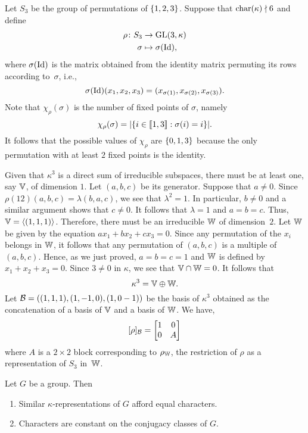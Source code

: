 \begin{xmpl}\label{xmpl:S_3-character}
    Let $S_3$ be the group of permutations of $\{1,2,3\}$. Suppose that $\operatorname{char}(\kappa)\nmid6$ and define
    \begin{align*}
        \rho\colon S_3&\to\operatorname{GL}(3,\kappa)\\
        \sigma&\mapsto\sigma(\operatorname{Id}),
    \end{align*}
    where $\sigma(\operatorname{Id})$ is the matrix obtained from the identity matrix permuting its rows according to~$\sigma$, i.e.,
    $$
        \sigma(\operatorname{Id})(x_1,x_2,x_3)
            =
            (x_{\sigma(1)},x_{\sigma(2)},x_{\sigma(3)}).
    $$
    Note that $\chi_\rho(\sigma)$ is the number of fixed points of $\sigma$, namely
    $$
        \chi_\rho(\sigma) = |\{i\in\llbracket1,3\rrbracket:\sigma(i)=i\}|.
    $$
    It follows that the possible values of $\chi_\rho$ are $\{0,1,3\}$ because the only permutation with at least $2$ fixed points is the identity.

    Given that $\kappa^3$ is a direct sum of irreducible subspaces, there must be at least one, say $\mathbb V$, of dimension $1$. Let $(a,b,c)$ be its generator. Suppose that $a\ne0$. Since $\rho(12)(a,b,c)=\lambda(b,a,c)$, we see that $\lambda^2=1$. In particular, $b\ne0$ and a similar argument shows that $c\ne0$. It follows that $\lambda=1$ and $a=b=c$. Thus, $\mathbb V=\langle(1,1,1)\rangle$. Therefore, there must be an irreducible $\mathbb W$ of dimension~$2$. Let $\mathbb W$ be given by the equation $ax_1+bx_2+cx_3=0$. Since any permutation of the $x_i$ belongs in $\mathbb W$, it follows that any permutation of $(a,b,c)$ is a multiple of $(a,b,c)$. Hence, as we just proved, $a=b=c=1$ and $\mathbb W$ is defined by $x_1+x_2+x_3=0$. Since $3\ne0$ in $\kappa$, we see that $\mathbb V\cap\mathbb W=0$. It follows that
    $$
        \kappa^3 = \mathbb V\oplus\mathbb W.
    $$
    Let $\mathcal B=((1,1,1),(1,-1,0),(1,0-1))$ be the basis of $\kappa^3$ obtained as the concatenation of a basis of $\mathbb V$ and a basis of $\mathbb W$. We have,
    $$
        [\rho]_{\mathcal B}=\begin{bmatrix}
            1   &0\\
            0   &A
        \end{bmatrix}
    $$
    where $A$ is a $2\times2$ block corresponding to $\rho_\mathbb W$, the restriction of $\rho$ as a representation of $S_3$ in~$\mathbb W$.
\end{xmpl}

\begin{lem} Let\/ $G$ be a group. Then
    \begin{enumerate}[\rm a)]
        \item Similar\/ $\kappa$-representations of\/ $G$ afford equal characters.

        \item Characters are constant on the conjugacy classes of\/ $G$.
    \end{enumerate}
\end{lem}


